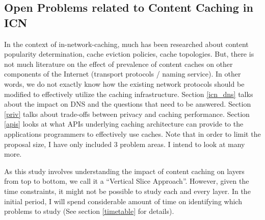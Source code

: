 \subsection{Open Problems related to Content Caching in ICN}
\label{caching_problems}
In the context of in-network-caching, much has been researched about
content popularity determination, cache eviction policies, cache
topologies. But, there is not much literature on the effect of
prevalence of content caches on other components of the Internet
(transport protocols / naming service). In other words, we do not
exactly know how the existing network protocols should be modified to
effectively utilize the caching infrastructure. Section \ref{icn_dns}
talks about the impact on DNS and the questions that need to be
answered. Section \ref{priv} talks about trade-offs between privacy
and caching performance. Section \ref{apis} looks at what APIs
underlying caching architecture can provide to the applications
programmers to effectively use caches. Note that in order to limit the
proposal size, I have only included 3 problem areas. I intend to look
at many more.

As this study involves understanding the impact of content caching on
layers from top to bottom, we call it a ``Vertical Slice
Approach''. However, given the time constraints, it might not be
possible to study each and every layer. In the initial period, I will
spend considerable amount of time on identifying which problems to
study (See section \ref{timetable} for details).


